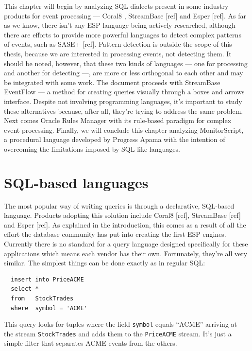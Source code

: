 \documentclass{report}
\begin{document}
This chapter will begin by analyzing SQL dialects present in some
industry products for event processing --- Coral8 \cite{coral8},
StreamBase [ref] and Esper [ref]. As far as we know, there isn't any
ESP language being actively researched, although there are efforts to
provide more powerful languages to detect complex patterns of events,
such as SASE+ [ref]. Pattern detection is outside the scope of this
thesis, because we are interested in processing events, not detecting
them. It should be noted, however, that these two kinds of languages
--- one for processing and another for detecting ---, are more or less
orthogonal to each other and may be integrated with some work. The
document proceeds with StreamBase EventFlow --- a method for creating
queries visually through a boxes and arrows interface. Despite not
involving programming languages, it's important to study these
alternatives because, after all, they're trying to address the same
problem. Next comes Oracle Rules Manager with its rule-based paradigm
for complex event processing. Finally, we will conclude this chapter
analyzing MonitorScript, a procedural language developed by Progress
Apama with the intention of overcoming the limitations imposed by
SQL-like languages.

\section{SQL-based languages}
\label{sec:sql}

The most popular way of writing queries is through a declarative,
SQL-based language. Products adopting this solution include Coral8
[ref], StreamBase [ref] and Esper [ref]. As explained in the
introduction, this comes as a result of all the effort the database
community has put into creating the first ESP engines. Currently there
is no standard for a query language designed specifically for these
applications which means each vendor has their own. Fortunately,
they're all very similar. The simplest things can be done exactly as
in regular SQL:

\lstset{
  language=CCL,
  columns=fullflexible,
  basicstyle=\tt,
  keywordstyle=[1]\bf,
  keywordstyle=[2]\it,
}

\begin{lstlisting}
  insert into PriceACME
  select *
  from   StockTrades
  where  symbol = 'ACME'
\end{lstlisting}


This query looks for tuples where the field \verb=symbol= equals
``ACME'' arriving at the stream \verb=StockTrades= and adds them to
the \verb=PriceACME= stream. It's just a simple filter that separates
ACME events from the others.
\end{document}
